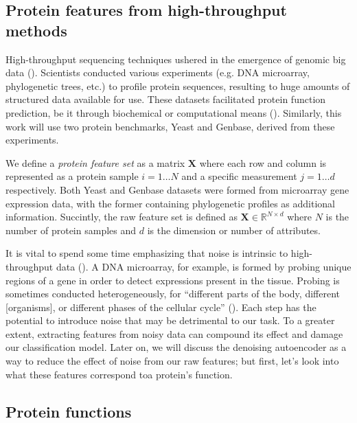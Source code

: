 \subsection{Protein features from high-throughput methods}

\par High-throughput sequencing techniques ushered in the emergence of
genomic big data (\cite{reuter2015high}). Scientists conducted various
experiments (e.g. DNA microarray, phylogenetic trees, etc.) to profile
protein sequences, resulting to huge amounts of structured data available for
use. These datasets facilitated protein function prediction, be it through
biochemical or computational means (\cite{eisenberg2000protein,
marcotte1999combined}). Similarly, this work will use two protein benchmarks,
Yeast and Genbase, derived from these experiments.

\par We define a \textit{protein feature set} as a matrix $\mathbf{X}$ where
each row and column is represented as a protein sample $i=1\dots N$ and a
specific measurement $j=1\dots d$ respectively. Both Yeast and Genbase
datasets were formed from microarray gene expression data, with the former
containing phylogenetic profiles as additional information. Succintly, the
raw feature set is defined as $\mathbf{X} \in \mathbb{R}^{N \times d}$ where $N$
is the number of protein samples and $d$ is the dimension or number of
attributes.

\par It is vital to spend some time emphasizing that noise is intrinsic to
high-throughput data (\cite{hong2013estimating}). A DNA microarray, for
example, is formed by probing unique regions of a gene in order to detect
expressions present in the tissue. Probing is sometimes conducted
heterogeneously, for ``different parts of the body, different [organisms], or
different phases of the cellular cycle'' (\cite{nguyen2009noise}). Each step
has the potential to introduce noise that may be detrimental to our task. To
a greater extent, extracting features from noisy data can compound its effect
and damage our classification model. Later on, we will discuss the denoising
autoencoder as a way to reduce the effect of noise from our raw features; but
first, let's look into what these features correspond to\textemdash a
protein's function.

\subsection{Protein functions}

